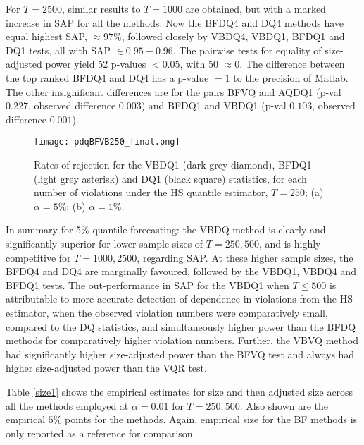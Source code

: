 \documentclass[12pt,epsf]{article}
\begin{document}
For $T=2500$, similar results to $T=1000$ are obtained, but with a marked increase in SAP for all the
methods. Now the BFDQ4 and DQ4 methods have equal highest SAP, $\approx 97\%$, followed closely by VBDQ4, VBDQ1, BFDQ1 and DQ1 tests, all with
SAP $\in 0.95-0.96$. The pairwise tests for equality of size-adjusted power yield 52 p-values $<0.05$, with 50 $\approx 0$. The
difference between the top ranked BFDQ4 and DQ4 has a p-value $=1$ to the precision of Matlab. The other insignificant differences are for
the pairs BFVQ and AQDQ1 (p-val $0.227$, observed difference $0.003$) and BFDQ1 and VBDQ1 (p-val $0.103$, observed difference $0.001$).

\begin{figure}%
     \centering
      \texttt{[image: pdqBFVB250\_final.png]}
\caption{\label{pdqBF250} Rates of rejection for the VBDQ1 (dark grey diamond), BFDQ1 (light grey asterisk) and DQ1 (black square) statistics,  
for each number of violations under the HS quantile estimator, $T=250$; (a) $\alpha =5\%$; (b) $\alpha =1\%$.}
\end{figure}

In summary for 5\% quantile forecasting: the VBDQ method is clearly and significantly superior for lower sample sizes of $T=250, 500$, and is
highly competitive for $T=1000, 2500$, regarding SAP. At these higher sample sizes, the BFDQ4 and DQ4 are marginally favoured, followed
by the VBDQ1, VBDQ4 and BFDQ1 tests. The out-performance in SAP for the VBDQ1 when $T \le 500$ is attributable to more
accurate detection of dependence in violations from the HS estimator, when the observed violation numbers were comparatively
small, compared to the DQ statistics, and simultaneously higher power than the BFDQ methods for comparatively higher violation numbers.
Further, the VBVQ method had significantly higher size-adjusted power than the BFVQ test and always had higher size-adjusted
power than the VQR test.

Table \ref{size1} shows the empirical estimates for size and then adjusted size across all the methods employed at $\alpha=0.01$ for
$T=250, 500$. Also shown are the empirical $5\%$ points for the methods. Again, empirical size for the BF methods is only reported as a
reference for comparison.
\end{document}
